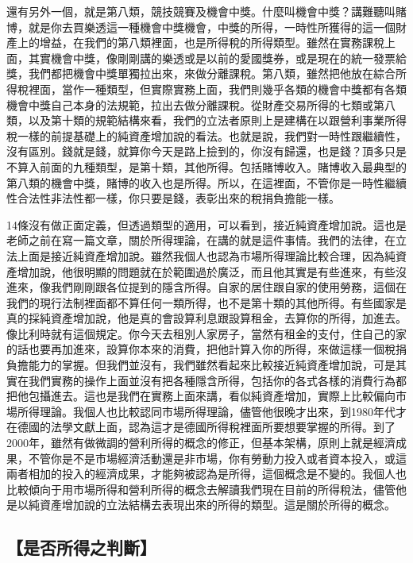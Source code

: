 \documentclass[oneside,sub3section]{ctexbook}
\begin{document}
還有另外一個，就是第八類，競技競賽及機會中獎。什麼叫機會中獎？講難聽叫賭博，就是你去買樂透這一種機會中獎機會，中獎的所得，一時性所獲得的這一個財產上的增益，在我們的第八類裡面，也是所得稅的所得類型。雖然在實務課稅上面，其實機會中獎，像剛剛講的樂透或是以前的愛國獎券，或是現在的統一發票給獎，我們都把機會中獎單獨拉出來，來做分離課稅。第八類，雖然把他放在綜合所得稅裡面，當作一種類型，但實際實務上面，我們則幾乎各類的機會中獎都有各類機會中獎自己本身的法規範，拉出去做分離課稅。從財產交易所得的七類或第八類，以及第十類的規範結構來看，我們的立法者原則上是建構在以跟營利事業所得稅一樣的前提基礎上的純資產增加說的看法。也就是說，我們對一時性跟繼續性，沒有區別。錢就是錢，就算你今天是路上撿到的，你沒有歸還，也是錢？頂多只是不算入前面的九種類型，是第十類，其他所得。包括賭博收入。賭博收入最典型的第八類的機會中獎，賭博的收入也是所得。所以，在這裡面，不管你是一時性繼續性合法性非法性都一樣，你只要是錢，表彰出來的稅捐負擔能一樣。

14條沒有做正面定義，但透過類型的適用，可以看到，接近純資產增加說。這也是老師之前在寫一篇文章，關於所得理論，在講的就是這件事情。我們的法律，在立法上面是接近純資產增加說。雖然我個人也認為市場所得理論比較合理，因為純資產增加說，他很明顯的問題就在於範圍過於廣泛，而且他其實是有些進來，有些沒進來，像我們剛剛跟各位提到的隱含所得。自家的居住跟自家的使用勞務，這個在我們的現行法制裡面都不算任何一類所得，也不是第十類的其他所得。有些國家是真的採純資產增加說，他是真的會設算利息跟設算租金，去算你的所得，加進去。像比利時就有這個規定。你今天去租別人家房子，當然有租金的支付，住自己的家的話也要再加進來，設算你本來的消費，把他計算入你的所得，來做這樣一個稅捐負擔能力的掌握。但我們並沒有，我們雖然看起來比較接近純資產增加說，可是其實在我們實務的操作上面並沒有把各種隱含所得，包括你的各式各樣的消費行為都把他包攝進去。這也是我們在實務上面來講，看似純資產增加，實際上比較偏向市場所得理論。我個人也比較認同市場所得理論，儘管他很晚才出來，到1980年代才在德國的法學文獻上面，認為這才是德國所得稅裡面所要想要掌握的所得。到了2000年，雖然有做微調的營利所得的概念的修正，但基本架構，原則上就是經濟成果，不管你是不是市場經濟活動還是非市場，你有勞動力投入或者資本投入，或這兩者相加的投入的經濟成果，才能夠被認為是所得，這個概念是不變的。我個人也比較傾向于用市場所得和營利所得的概念去解讀我們現在目前的所得稅法，儘管他是以純資產增加說的立法結構去表現出來的所得的類型。這是關於所得的概念。

\hypertarget{ux662fux5426ux6240ux5f97ux4e4bux5224ux65b7}{%
\subsection{【是否所得之判斷】}\label{ux662fux5426ux6240ux5f97ux4e4bux5224ux65b7}}
\end{document}
